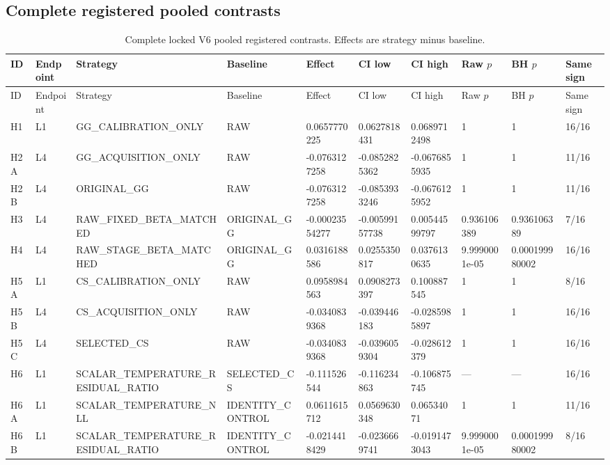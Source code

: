 \documentclass[10pt]{article}
\begin{document}
\begin{landscape}
\section{Complete registered pooled contrasts}


\begingroup\scriptsize
\begin{longtable}{L{.35in}L{.45in}L{1.35in}L{1.1in}L{.9in}L{.9in}L{.9in}L{.85in}L{.85in}L{.65in}}
\caption{Complete locked V6 pooled registered contrasts. Effects are strategy minus baseline.}\\
\toprule
ID & Endpoint & Strategy & Baseline & Effect & CI low & CI high & Raw $p$ & BH $p$ & Same sign\\
\midrule
\endfirsthead
\toprule
ID & Endpoint & Strategy & Baseline & Effect & CI low & CI high & Raw $p$ & BH $p$ & Same sign\\
\midrule
\endhead
H1 & L1 & GG\_\allowbreak{}CALIBRATION\_\allowbreak{}ONLY & RAW & 0.0657770225 & 0.0627818431 & 0.0689712498 & 1 & 1 & 16/16\\
H2A & L4 & GG\_\allowbreak{}ACQUISITION\_\allowbreak{}ONLY & RAW & -0.0763127258 & -0.0852825362 & -0.0676855935 & 1 & 1 & 11/16\\
H2B & L4 & ORIGINAL\_\allowbreak{}GG & RAW & -0.0763127258 & -0.0853933246 & -0.0676125952 & 1 & 1 & 11/16\\
H3 & L4 & RAW\_\allowbreak{}FIXED\_\allowbreak{}BETA\_\allowbreak{}MATCHED & ORIGINAL\_\allowbreak{}GG & -0.00023554277 & -0.00599157738 & 0.00544599797 & 0.936106389 & 0.936106389 & 7/16\\
H4 & L4 & RAW\_\allowbreak{}STAGE\_\allowbreak{}BETA\_\allowbreak{}MATCHED & ORIGINAL\_\allowbreak{}GG & 0.0316188586 & 0.0255350817 & 0.0376130635 & 9.9990001e-05 & 0.000199980002 & 16/16\\
H5A & L1 & CS\_\allowbreak{}CALIBRATION\_\allowbreak{}ONLY & RAW & 0.0958984563 & 0.0908273397 & 0.100887545 & 1 & 1 & 8/16\\
H5B & L4 & CS\_\allowbreak{}ACQUISITION\_\allowbreak{}ONLY & RAW & -0.0340839368 & -0.039446183 & -0.0285985897 & 1 & 1 & 16/16\\
H5C & L4 & SELECTED\_\allowbreak{}CS & RAW & -0.0340839368 & -0.0396059304 & -0.028612379 & 1 & 1 & 16/16\\
H6 & L1 & SCALAR\_\allowbreak{}TEMPERATURE\_\allowbreak{}RESIDUAL\_\allowbreak{}RATIO & SELECTED\_\allowbreak{}CS & -0.111526544 & -0.116234863 & -0.106875745 & --- & --- & 16/16\\
H6A & L1 & SCALAR\_\allowbreak{}TEMPERATURE\_\allowbreak{}NLL & IDENTITY\_\allowbreak{}CONTROL & 0.0611615712 & 0.0569630348 & 0.06534071 & 1 & 1 & 11/16\\
H6B & L1 & SCALAR\_\allowbreak{}TEMPERATURE\_\allowbreak{}RESIDUAL\_\allowbreak{}RATIO & IDENTITY\_\allowbreak{}CONTROL & -0.0214418429 & -0.0236669741 & -0.0191473043 & 9.9990001e-05 & 0.000199980002 & 8/16\\
\bottomrule
\end{longtable}
\endgroup

\end{landscape}
\end{document}
